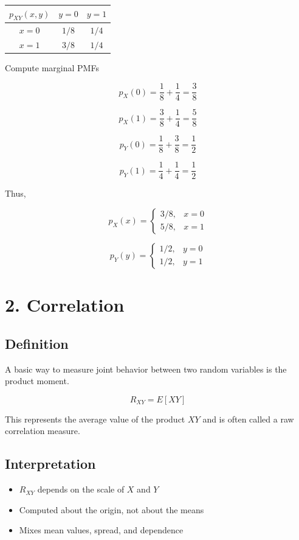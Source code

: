 \documentclass[11pt]{article}
\begin{document}
\begin{center}
\begin{tabular}{c|cc}
$p_{XY}(x,y)$ & $y=0$ & $y=1$ \\
\midrule
$x=0$ & $1/8$ & $1/4$ \\
$x=1$ & $3/8$ & $1/4$
\end{tabular}
\end{center}

Compute marginal PMFs

\[
p_X(0) = \frac{1}{8} + \frac{1}{4} = \frac{3}{8}
\]

\[
p_X(1) = \frac{3}{8} + \frac{1}{4} = \frac{5}{8}
\]

\[
p_Y(0) = \frac{1}{8} + \frac{3}{8} = \frac{1}{2}
\]

\[
p_Y(1) = \frac{1}{4} + \frac{1}{4} = \frac{1}{2}
\]

Thus,

\[
p_X(x)=
\begin{cases}
3/8, & x=0 \\
5/8, & x=1
\end{cases}
\]

\[
p_Y(y)=
\begin{cases}
1/2, & y=0 \\
1/2, & y=1
\end{cases}
\]

\section*{2. Correlation}

\subsection*{Definition}

A basic way to measure joint behavior between two random variables is the product moment.

\[
R_{XY} = E[XY]
\]

This represents the average value of the product $XY$ and is often called a raw correlation measure.

\subsection*{Interpretation}

\begin{itemize}
\item $R_{XY}$ depends on the scale of $X$ and $Y$
\item Computed about the origin, not about the means
\item Mixes mean values, spread, and dependence
\end{itemize}
\end{document}
